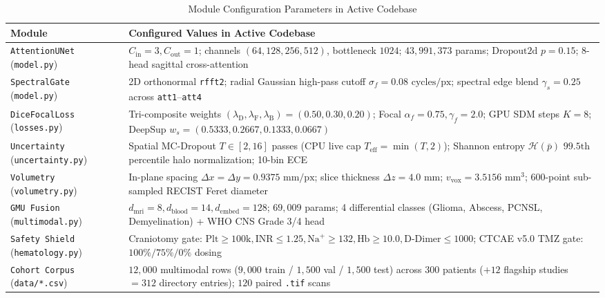 \documentclass[journal,onecolumn,10pt]{IEEEtran}
\begin{document}
\begin{table}[t]
\centering
\caption{Module Configuration Parameters in Active Codebase}
\label{tab:config}
\begin{tabular}{@{}L{1.95cm}L{6.25cm}@{}}
\toprule
\textbf{Module} & \textbf{Configured Values in Active Codebase} \\
\midrule
\texttt{AttentionUNet} (\texttt{model.py}) & $C_{\text{in}}=3, C_{\text{out}}=1$; channels $(64,128,256,512)$, bottleneck $1024$; $43,991,373$ params; $\text{Dropout2d } p=0.15$; 8-head sagittal cross-attention \\
\texttt{SpectralGate} (\texttt{model.py}) & 2D orthonormal \texttt{rfft2}; radial Gaussian high-pass cutoff $\sigma_f = 0.08\text{ cycles/px}$; spectral edge blend $\gamma_s = 0.25$ across \texttt{att1}--\texttt{att4} \\
\texttt{DiceFocalLoss} (\texttt{losses.py}) & Tri-composite weights $(\lambda_{\text{D}}, \lambda_{\text{F}}, \lambda_{\text{B}}) = (0.50, 0.30, 0.20)$; Focal $\alpha_f = 0.75, \gamma_f = 2.0$; GPU SDM steps $K = 8$; DeepSup $w_s = (0.5333, 0.2667, 0.1333, 0.0667)$ \\
\texttt{Uncertainty} (\texttt{uncertainty.py}) & Spatial MC-Dropout $T \in [2, 16]$ passes (CPU live cap $T_{\text{eff}} = \min(T, 2)$); Shannon entropy $\mathcal{H}(\bar{p})$ $99.5\text{th}$ percentile halo normalization; 10-bin ECE \\
\texttt{Volumetry} (\texttt{volumetry.py}) & In-plane spacing $\Delta x = \Delta y = 0.9375\text{ mm/px}$; slice thickness $\Delta z = 4.0\text{ mm}$; $v_{\text{vox}} = 3.5156\text{ mm}^3$; 600-point sub-sampled RECIST Feret diameter \\
\texttt{GMU Fusion} (\texttt{multimodal.py}) & $d_{\text{mri}}=8, d_{\text{blood}}=14, d_{\text{embed}}=128$; $69,009$ params; 4 differential classes (Glioma, Abscess, PCNSL, Demyelination) + WHO CNS Grade 3/4 head \\
\texttt{Safety Shield} (\texttt{hematology.py}) & Craniotomy gate: $\text{Plt} \ge 100\text{k}, \text{INR} \le 1.25, \text{Na}^+ \ge 132, \text{Hb} \ge 10.0, \text{D-Dimer} \le 1000$; CTCAE v5.0 TMZ gate: $100\% / 75\% / 0\%$ dosing \\
\texttt{Cohort Corpus} (\texttt{data/*.csv}) & $12,000$ multimodal rows ($9,000$ train / $1,500$ val / $1,500$ test) across $300$ patients ($+12$ flagship studies $= 312$ directory entries); $120$ paired \texttt{.tif} scans \\
\bottomrule
\end{tabular}
\end{table}
\end{document}
